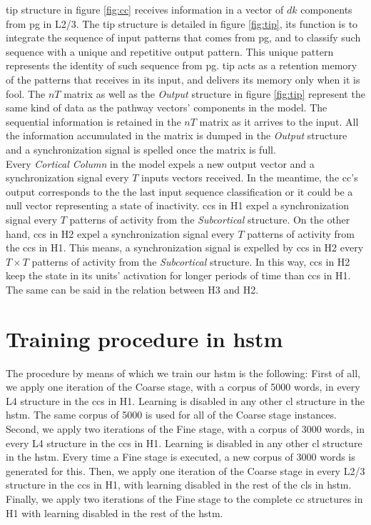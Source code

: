 \documentclass[11pt,a4paper]{article}
\begin{document}
\begin{appendices}
\ac{tip} structure in figure \ref{fig:cc} receives information in a vector of $dk$ components from \ac{pg}
in L2/3.
The \ac{tip} structure is detailed in figure \ref{fig:tip},
its function is to integrate the sequence of input patterns that comes from \ac{pg},
and to classify such sequence with a unique and repetitive output pattern.
This unique pattern represents the identity of such sequence from \ac{pg}.
\ac{tip} acts as a retention memory of the patterns that receives in its input,
and delivers its memory only when it is fool.
The $nT$ matrix as well as the \textit{Output} structure in figure \ref{fig:tip}
represent the same kind of data as the pathway vectors' components in the model.
The sequential information is retained in the $nT$ matrix as it arrives
to the input.
All the information accumulated in the matrix is dumped in the \textit{Output}
structure and a synchronization signal is spelled once the matrix is full.\\

Every \textit{Cortical Column} in the model expels a new output vector and a synchronization signal
every $T$ inputs vectors received.
In the meantime, the \ac{cc}'s output corresponds to the the last input sequence
classification or it could be a null vector representing a state of inactivity.
\ac{cc}s in H1 expel a synchronization signal
every $T$ patterns of activity from the
\textit{Subcortical} structure.
On the other hand, \ac{cc}s in H2 expel a synchronization signal every
$T$ patterns of activity from the \ac{cc}s in H1.
This means, a synchronization signal is expelled by \ac{cc}s in H2 every
$T \times T$ patterns of activity from the \textit{Subcortical} structure.
In this way, \ac{cc}s in H2 keep the state in its units' activation for longer
periods of time than \ac{cc}s in H1.
The same can be said in the relation between H3 and H2.\\


\section{Training procedure in \ac{hstm}} \label{training}
The procedure by means of which we train our \ac{hstm} is the following:
First of all, we apply one iteration of the Coarse stage, with a corpus of 5000 words,
in every L4 structure in the \ac{cc}s in H1.
Learning is disabled in any other \ac{cl} structure in the \ac{hstm}.
The same corpus of 5000 is used for all of the Coarse stage instances.
Second, we apply two iterations of the Fine stage, with a corpus of 3000 words,
in every L4 structure in the \ac{cc}s in H1.
Learning is disabled in any other \ac{cl} structure in the \ac{hstm}.
Every time a Fine stage is executed, a new corpus of 3000 words is generated for this.
Then, we apply one iteration of the Coarse stage in every L2/3 structure
in the \ac{cc}s in H1, with learning disabled in the rest of the
\ac{cl}s in \ac{hstm}.
Finally, we apply two iterations of the Fine stage to the complete \ac{cc}
structures in H1 with learning disabled in the rest of the \ac{hstm}.\\


\end{appendices}
\end{document}
